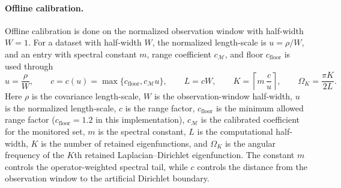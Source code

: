 \documentclass[11pt,a4paper]{article}
\theoremstyle{definition}
\theoremstyle{remark}
\begin{document}
\paragraph{Offline calibration.}
Offline calibration is done on the normalized observation window with half-width \(W=1\). For a dataset with half-width \(W\), the normalized length-scale is \(u=\rho/W\), and an entry with spectral constant \(m\), range coefficient \(c_{\mathcal M}\), and floor \(c_{\mathrm{floor}}\) is used through
\[
u=\frac{\rho}{W},
\qquad
c=c(u)=\max\{c_{\mathrm{floor}},c_{\mathcal M}u\},
\qquad
L=cW,
\qquad
K=\left\lceil m\,\frac{c}{u}\right\rceil,
\qquad
\Omega_K=\frac{\pi K}{2L}.
\]
Here \(\rho\) is the covariance length-scale, \(W\) is the observation-window half-width, \(u\) is the normalized length-scale, \(c\) is the range factor, \(c_{\mathrm{floor}}\) is the minimum allowed range factor (\(c_{\mathrm{floor}}=1.2\) in this implementation), \(c_{\mathcal M}\) is the calibrated coefficient for the monitored set, \(m\) is the spectral constant, \(L\) is the computational half-width, \(K\) is the number of retained eigenfunctions, and \(\Omega_K\) is the angular frequency of the \(K\)th retained Laplacian--Dirichlet eigenfunction. The constant \(m\) controls the operator-weighted spectral tail, while \(c\) controls the distance from the observation window to the artificial Dirichlet boundary.
\end{document}
